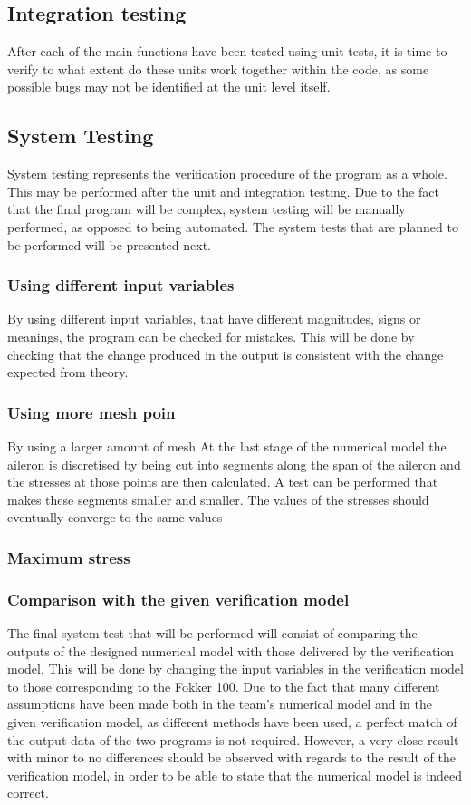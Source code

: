 \subsection{Integration testing}
After each of the main functions have been tested using unit tests, it is time to verify to what extent do these units work together within the code, as some possible bugs may not be identified at the unit level itself.

\subsection{System Testing}
System testing represents the verification procedure of the program as a whole. This may be performed after the unit and integration testing. Due to the fact that the final program will be complex, system testing will be manually performed, as opposed to being automated. The system tests that are planned to be performed will be presented next.

\subsubsection{Using different input variables}
By using different input variables, that have different magnitudes, signs or meanings, the program can be checked for mistakes. This will be done by checking that the change produced in the output is consistent with the change expected from theory.   

\subsubsection{Using more mesh poin}
By using a larger amount of mesh 
At the last stage of the numerical model the aileron is discretised by being cut into segments along the span
of the aileron and the stresses at those points are then calculated. A test can be performed that makes these
segments smaller and smaller. The values of the stresses should eventually converge to the same values

\subsubsection{Maximum stress}

\subsubsection{Comparison with the given verification model}
The final system test that will be performed will consist of comparing the outputs of the designed numerical model with those delivered by the verification model. This will be done by changing the input variables in the verification model to those corresponding to the Fokker 100. Due to the fact that many different assumptions have been made both in the team's numerical model and in the given verification model, as different methods have been used, a perfect match of the output data of the two programs is not required. However, a very close result with minor to no differences should be observed with regards to the result of the verification model, in order to be able to state that the numerical model is indeed correct. 




